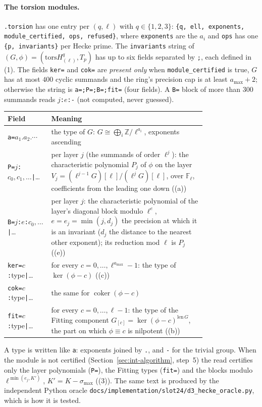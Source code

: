 \documentclass[11pt,openany]{report}
\newcommand{\Z}{\mathbb{Z}}
\newcommand{\Fl}{\mathbb{F}_{\ell}}
\newcommand{\tors}{\mathrm{tors}}
\newcommand{\file}[1]{\nolinkurl{#1}}
\begin{document}
\paragraph{The torsion modules.} \texttt{.torsion} has one entry per $(q,\ell)$ with $q\in\{1,2,3\}$: \texttt{\{q, ell,
exponents, module\_certified, ops, refused\}}, where \texttt{exponents} are the $a_i$ and \texttt{ops} has one
\texttt{\{p, invariants\}} per Hecke prime. The \texttt{invariants} string of $(G,\phi)=(\tors H^q_{(\ell)},T_p)$ has up to six
fields separated by \texttt{;}, each defined in {}(1). The fields \texttt{ker=} and
\texttt{cok=} are \emph{present only} when \texttt{module\_certified} is true, $G$ has at most $400$ cyclic summands and the
ring's precision cap is at least $a_{\max}+2$; otherwise the string is \texttt{a=;P=;B=;fit=} (four fields). A
\texttt{B=} block of more than $300$ summands reads \texttt{$j$:$e$:-} (not computed, never guessed).
\begin{center}\small
\begin{tabular}{@{}l>{\raggedright\arraybackslash}p{0.78\linewidth}@{}}
\toprule
\textbf{Field} & \textbf{Meaning}\\\midrule
\texttt{a=}$a_1.a_2.\cdots$ & the type of $G$: $G\cong\bigoplus_i\Z/\ell^{a_i}$, exponents ascending\\
\texttt{P=}$j$\texttt{:}$c_0,c_1,\dots$\texttt{|}\dots & per layer $j$ (the summands of order $\ell^j$): the characteristic polynomial $P_j$ of $\phi$ on the layer $V_j=(\ell^{j-1}G)[\ell]/(\ell^jG)[\ell]$, over $\Fl$, coefficients from the leading one down ((a))\\
\texttt{B=}$j$\texttt{:}$e$\texttt{:}$c_0,\dots$\texttt{|}\dots & per layer $j$: the characteristic polynomial of the layer's diagonal block modulo $\ell^{e}$, $e=e_j=\min(j,d_j)$ the precision at which it is an invariant ($d_j$ the distance to the nearest other exponent); its reduction mod $\ell$ is $P_j$ ((e))\\
\texttt{ker=}$c$\texttt{:}type\texttt{|}\dots & for every $c=0,\dots,\ell^{a_{\max}}-1$: the type of $\ker(\phi-c)$ ((c))\\
\texttt{cok=}$c$\texttt{:}type\texttt{|}\dots & the same for $\operatorname{coker}(\phi-c)$\\
\texttt{fit=}$c$\texttt{:}type\texttt{|}\dots & for every $c=0,\dots,\ell-1$: the type of the Fitting component $G_{[c]}=\ker(\phi-c)^{\mathrm{len}\,G}$, the part on which $\phi\equiv c$ is nilpotent ((b))\\
\bottomrule
\end{tabular}
\end{center}
A type is written like \texttt{a}: exponents joined by \texttt{.}, and \texttt{-} for the trivial group. When the module is
not certified (Section~\ref{sec:int-algorithm}, step~5) the read certifies only the layer polynomials (\texttt{P=}), the Fitting types (\texttt{fit=}) and the blocks
modulo $\ell^{\min(e_j,K')}$, $K'=K-\sigma_{\max}$ ({}(3)). The same text is produced by the independent Python oracle
\file{docs/implementation/slot24/d3_hecke_oracle.py}, which is how it is tested.
\end{document}
